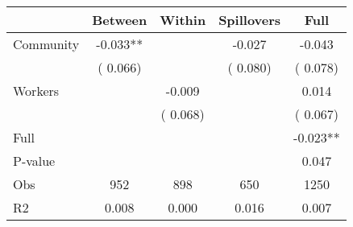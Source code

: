 
\begin{tabular}{l*{4}{c}}\hline&\multicolumn{1}{c}{Between}&\multicolumn{1}{c}{Within}&\multicolumn{1}{c}{Spillovers}&\multicolumn{1}{c}{Full}\\ \hline
 Community             &             -0.033**      &                                               &       -0.027 &        -0.043                            \\ 
                               &        (       0.066)           &                                       &       (       0.080)     &      (       0.078)                                           \\ 
 Workers       &                                               &       -0.009    &                                &             0.014                            \\ 
                               &                                               & (       0.068)                  &                                        &      (       0.067)                                           \\ 
\hline                                                                                                                                                                                                                                            
 Full                  &                                               &                                               &                                        &            -0.023**                                     \\ 
 P-value               &                                               &                                               &                                        &             0.047                                           \\ 
 Obs                   &               952               &       898                       &       650                &              1250                                               \\ 
 R2                    &                      0.008              &              0.000                      &              0.016               &                     0.007                                              \\ 
\hline \end{tabular}                                                                                                                                                                                                              